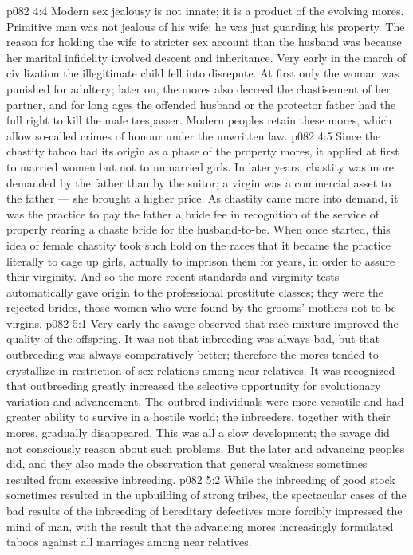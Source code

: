 \vs p082 4:4 Modern sex jealousy is not innate; it is a product of the evolving mores. Primitive man was not jealous of his wife; he was just guarding his property. The reason for holding the wife to stricter sex account than the husband was because her marital infidelity involved descent and inheritance. Very early in the march of civilization the illegitimate child fell into disrepute. At first only the woman was punished for adultery; later on, the mores also decreed the chastisement of her partner, and for long ages the offended husband or the protector father had the full right to kill the male trespasser. Modern peoples retain these mores, which allow so\hyp{}called crimes of honour under the unwritten law.
\vs p082 4:5 Since the chastity taboo had its origin as a phase of the property mores, it applied at first to married women but not to unmarried girls. In later years, chastity was more demanded by the father than by the suitor; a virgin was a commercial asset to the father --- she brought a higher price. As chastity came more into demand, it was the practice to pay the father a bride fee in recognition of the service of properly rearing a chaste bride for the husband\hyp{}to\hyp{}be. When once started, this idea of female chastity took such hold on the races that it became the practice literally to cage up girls, actually to imprison them for years, in order to assure their virginity. And so the more recent standards and virginity tests automatically gave origin to the professional prostitute classes; they were the rejected brides, those women who were found by the grooms’ mothers not to be virgins.
\vs p082 5:1 Very early the savage observed that race mixture improved the quality of the offspring. It was not that inbreeding was always bad, but that outbreeding was always comparatively better; therefore the mores tended to crystallize in restriction of sex relations among near relatives. It was recognized that outbreeding greatly increased the selective opportunity for evolutionary variation and advancement. The outbred individuals were more versatile and had greater ability to survive in a hostile world; the inbreeders, together with their mores, gradually disappeared. This was all a slow development; the savage did not consciously reason about such problems. But the later and advancing peoples did, and they also made the observation that general weakness sometimes resulted from excessive inbreeding.
\vs p082 5:2 While the inbreeding of good stock sometimes resulted in the upbuilding of strong tribes, the spectacular cases of the bad results of the inbreeding of hereditary defectives more forcibly impressed the mind of man, with the result that the advancing mores increasingly formulated taboos against all marriages among near relatives.

